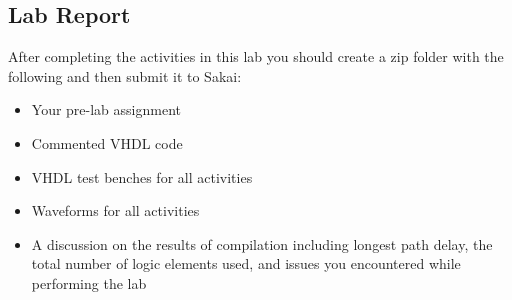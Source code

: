 \subsection{Lab Report}
After completing the activities in this lab you should create a zip folder with the following and then submit it to Sakai:

\begin{itemize}
	\item Your pre-lab assignment
	\item Commented VHDL code
	\item VHDL test benches for all activities
	\item Waveforms for all activities
	\item A discussion on the results of compilation including longest path delay, the total number of logic elements used, and issues you encountered while performing the lab
\end{itemize}